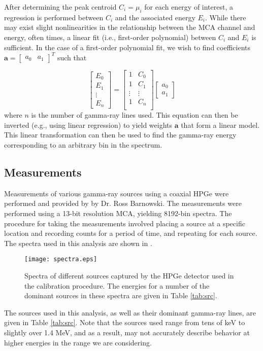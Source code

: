 After determining the peak centroid $C_i = \mu_i$ for each energy of interest, a regression is performed between $C_i$ and the associated energy $E_i$.
While there may exist slight nonlinearities in the relationship between the MCA channel and energy, often times, a linear fit (i.e., first-order polynomial) between $C_i$ and $E_i$ is sufficient.
In the case of a first-order polynomial fit, we wish to find coefficients
$\mathbf{a} = \begin{bmatrix}a_0 & a_1 \end{bmatrix}^T$ such that

\begin{equation}
    \begin{bmatrix}
        E_0 \\ E_1 \\ \vdots \\ E_n
    \end{bmatrix} =
    \begin{bmatrix}
        1 & C_0 \\
        1 & C_1 \\
        \vdots & \vdots \\
        1 & C_n \\
    \end{bmatrix}
    \begin{bmatrix}
        a_0 \\ a_1
    \end{bmatrix}
\end{equation}
where $n$ is the number of gamma-ray lines used. This equation can then be inverted (e.g., using linear regression) to yield weights $\mathbf{a}$ that form a linear model.
This linear transformation can then be used to find the gamma-ray energy corresponding to an arbitrary bin in the spectrum.

\subsection{Measurements}
Measurements of various gamma-ray sources using a coaxial HPGe were performed and provided by by Dr. Ross Barnowski.
The measurements were performed using a 13-bit resolution MCA, yielding 8192-bin spectra.
The procedure for taking the measurements involved placing a source at a specific location and recording counts for a period of time, and repeating for each source.
The spectra used in this analysis are shown in .

\begin{figure}
\centering
\texttt{[image: spectra.eps]}
\caption{Spectra of different sources captured by the HPGe detector used in the calibration procedure. The energies for a number of the dominant sources in these spectra are given in Table \ref{tab:src}.}
\label{fig:spectra}
\end{figure}
The sources used in this analysis, as well as their dominant gamma-ray lines, are given in Table \ref{tab:src}.
Note that the sources used range from tens of keV to slightly over 1.4 MeV, and as a result, may not accurately describe behavior at higher energies in the range we are considering.

